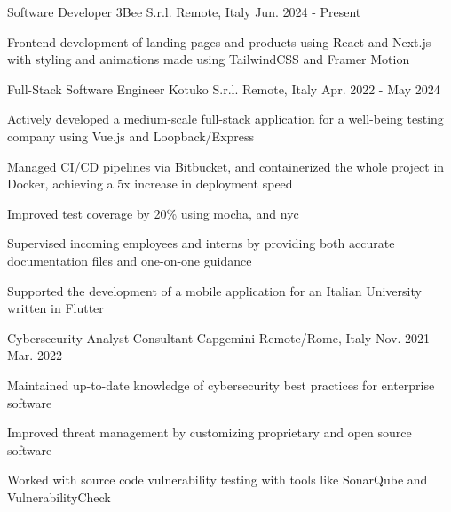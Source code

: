 

\begin{cventries}

	\cventry
	{Software Developer} %
	{3Bee S.r.l.} %
	{Remote, Italy} %
	{Jun. 2024 - Present} %
	{
		\begin{cvitems} %
			\item {Frontend development of landing pages and products using React and Next.js with styling and animations made using TailwindCSS and Framer Motion}
		\end{cvitems}
	}

	\cventry
	{Full-Stack Software Engineer} %
	{Kotuko S.r.l.} %
	{Remote, Italy} %
	{Apr. 2022 - May 2024} %
	{
		\begin{cvitems} %
			\item {Actively developed a medium-scale full-stack application for a well-being testing company using Vue.js and Loopback/Express}
			\item {Managed CI/CD pipelines via Bitbucket, and containerized the whole project in Docker, achieving a 5x increase in deployment speed}
			\item {Improved test coverage by 20\% using mocha, and nyc}
			\item {Supervised incoming employees and interns by providing both accurate documentation files and one-on-one guidance}
			\item {Supported the development of a mobile application for an Italian University written in Flutter}
		\end{cvitems}
	}

	\cventry
	{Cybersecurity Analyst Consultant} %
	{Capgemini} %
	{Remote/Rome, Italy} %
	{Nov. 2021 - Mar. 2022} %
	{
		\begin{cvitems} %
			\item {Maintained up-to-date knowledge of cybersecurity best practices for enterprise software}
			\item {Improved threat management by customizing proprietary and open source software}
			\item {Worked with source code vulnerability testing with tools like SonarQube and VulnerabilityCheck}
		\end{cvitems}
	}
\end{cventries}
